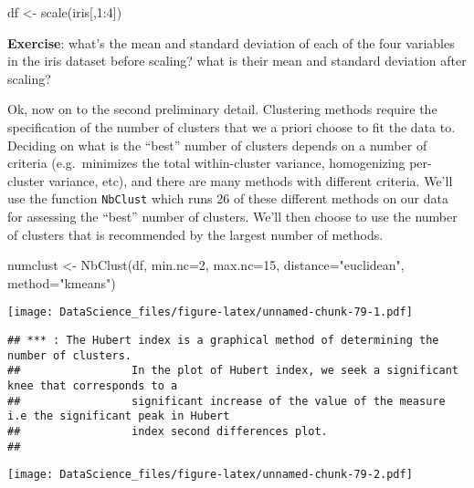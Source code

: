 \documentclass[
]{book}
\newenvironment{Shaded}{\begin{snugshade}}{\end{snugshade}}
\newcommand{\AttributeTok}[1]{\textcolor[rgb]{0.77,0.63,0.00}{#1}}
\newcommand{\DecValTok}[1]{\textcolor[rgb]{0.00,0.00,0.81}{#1}}
\newcommand{\FunctionTok}[1]{\textcolor[rgb]{0.00,0.00,0.00}{#1}}
\newcommand{\NormalTok}[1]{#1}
\newcommand{\OtherTok}[1]{\textcolor[rgb]{0.56,0.35,0.01}{#1}}
\newcommand{\SpecialCharTok}[1]{\textcolor[rgb]{0.00,0.00,0.00}{#1}}
\newcommand{\StringTok}[1]{\textcolor[rgb]{0.31,0.60,0.02}{#1}}
\begin{document}
\begin{Shaded}
\begin{Highlighting}[]
\NormalTok{df }\OtherTok{\textless{}{-}} \FunctionTok{scale}\NormalTok{(iris[,}\DecValTok{1}\SpecialCharTok{:}\DecValTok{4}\NormalTok{])}
\end{Highlighting}
\end{Shaded}

\textbf{Exercise}: what's the mean and standard deviation of each of the four variables in the iris dataset before scaling? what is their mean and standard deviation after scaling?

Ok, now on to the second preliminary detail. Clustering methods require the specification of the number of clusters that we a priori choose to fit the data to. Deciding on what is the ``best'' number of clusters depends on a number of criteria (e.g.~minimizes the total within-cluster variance, homogenizing per-cluster variance, etc), and there are many methods with different criteria. We'll use the function \texttt{NbClust} which runs 26 of these different methods on our data for assessing the ``best'' number of clusters. We'll then choose to use the number of clusters that is recommended by the largest number of methods.

\begin{Shaded}
\begin{Highlighting}[]
\NormalTok{numclust }\OtherTok{\textless{}{-}} \FunctionTok{NbClust}\NormalTok{(df, }\AttributeTok{min.nc=}\DecValTok{2}\NormalTok{, }\AttributeTok{max.nc=}\DecValTok{15}\NormalTok{, }\AttributeTok{distance=}\StringTok{"euclidean"}\NormalTok{, }\AttributeTok{method=}\StringTok{"kmeans"}\NormalTok{)}
\end{Highlighting}
\end{Shaded}

\texttt{[image: DataScience\_files/figure-latex/unnamed-chunk-79-1.pdf]}

\begin{verbatim}
## *** : The Hubert index is a graphical method of determining the number of clusters.
##                 In the plot of Hubert index, we seek a significant knee that corresponds to a 
##                 significant increase of the value of the measure i.e the significant peak in Hubert
##                 index second differences plot. 
## 
\end{verbatim}

\texttt{[image: DataScience\_files/figure-latex/unnamed-chunk-79-2.pdf]}
\end{document}
